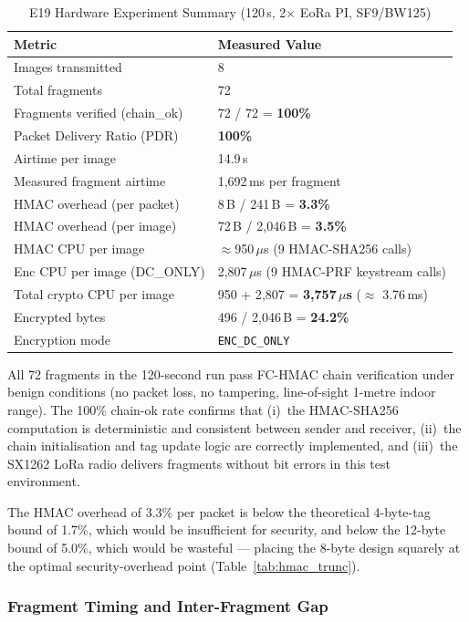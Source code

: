 \documentclass[journal]{IEEEtran}
\begin{document}
\begin{table}[ht]
\centering
\caption{E19 Hardware Experiment Summary (120\,s, 2$\times$ EoRa PI, SF9/BW125)}
\label{tab:e19_results}
\begin{tabular}{ll}
\toprule
Metric & Measured Value \\
\midrule
Images transmitted & 8 \\
Total fragments & 72 \\
Fragments verified (chain\_ok) & 72 / 72 = \textbf{100\%} \\
Packet Delivery Ratio (PDR) & \textbf{100\%} \\
Airtime per image & 14.9\,s \\
Measured fragment airtime & 1{,}692\,ms per fragment \\
\midrule
HMAC overhead (per packet) & 8\,B / 241\,B = \textbf{3.3\%} \\
HMAC overhead (per image) & 72\,B / 2{,}046\,B = \textbf{3.5\%} \\
HMAC CPU per image & $\approx$950\,$\mu$s (9 HMAC-SHA256 calls) \\
Enc CPU per image (DC\_ONLY) & 2{,}807\,$\mu$s (9 HMAC-PRF keystream calls) \\
Total crypto CPU per image & 950 + 2{,}807 = \textbf{3{,}757\,$\mu$s} ($\approx$ 3.76\,ms) \\
\midrule
Encrypted bytes & 496 / 2{,}046\,B = \textbf{24.2\%} \\
Encryption mode & \texttt{ENC\_DC\_ONLY} \\
\bottomrule
\end{tabular}
\end{table}

All 72 fragments in the 120-second run pass FC-HMAC chain verification under
benign conditions (no packet loss, no tampering, line-of-sight 1-metre indoor
range).  The 100\% chain-ok rate confirms that (i)~the HMAC-SHA256 computation
is deterministic and consistent between sender and receiver, (ii)~the chain
initialisation and tag update logic are correctly implemented, and (iii)~the
SX1262 LoRa radio delivers fragments without bit errors in this test
environment.

The HMAC overhead of 3.3\% per packet is below the theoretical 4-byte-tag
bound of 1.7\%, which would be insufficient for security, and below the
12-byte bound of 5.0\%, which would be wasteful --- placing the 8-byte design
squarely at the optimal security-overhead point (Table~\ref{tab:hmac_trunc}).

\subsubsection{Fragment Timing and Inter-Fragment Gap}
\end{document}
